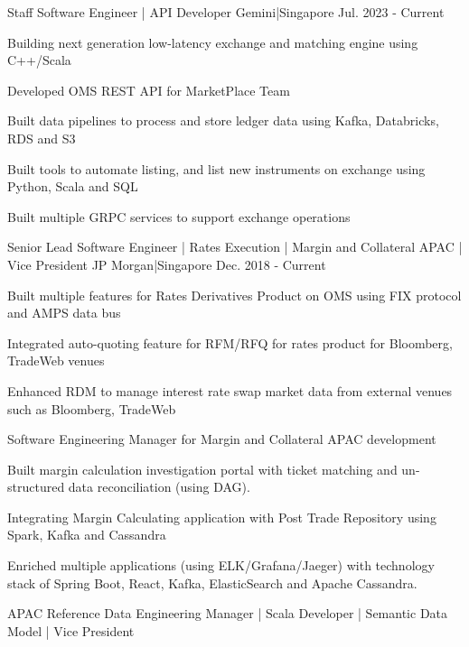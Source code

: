 \begin{cventries}
    {Staff Software Engineer | API Developer}
    {Gemini|Singapore}
    {Jul. 2023 - Current}
    {
      \begin{cvitems}
        \item {Building next generation low-latency exchange and matching engine using C++/Scala}
        \item {Developed OMS REST API for MarketPlace Team}
        \item {Built data pipelines to process and store ledger data using Kafka, Databricks, RDS and S3}
        \item {Built tools to automate listing, and list new instruments on exchange using Python, Scala and SQL}
        \item {Built multiple GRPC services to support exchange operations}
      \end{cvitems}
    }
    {Senior Lead Software Engineer | Rates Execution | Margin and Collateral APAC |  Vice President }
    {JP Morgan|Singapore}
    {Dec. 2018 - Current}
    {
      \begin{cvitems}
        \item {Built multiple features for Rates Derivatives Product on OMS using FIX protocol and AMPS data bus}
        \item {Integrated auto-quoting feature for RFM/RFQ for rates product for Bloomberg, TradeWeb venues}
        \item {Enhanced RDM to manage interest rate swap market data from external venues such as Bloomberg, TradeWeb}
        \item {Software Engineering Manager for Margin and Collateral APAC development}
        \item {Built margin calculation investigation portal with ticket matching and un-structured data reconciliation (using DAG).}
        \item {Integrating Margin Calculating application with Post Trade Repository using Spark, Kafka and Cassandra}
        \item {Enriched multiple applications (using ELK/Grafana/Jaeger) with technology stack of Spring Boot, React, Kafka, ElasticSearch and Apache Cassandra.}
      \end{cvitems}
    }
    {APAC Reference Data Engineering Manager | Scala Developer | Semantic Data Model | Vice President}

\end{cventries}
